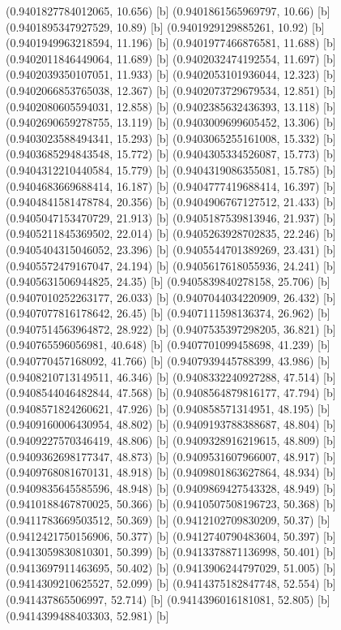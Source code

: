 {{{(0.9401827784012065, 10.656) [b] 
(0.9401861565969797, 10.66) [b] 
(0.9401895347927529, 10.89) [b] 
(0.9401929129885261, 10.92) [b] 
(0.9401949963218594, 11.196) [b] 
(0.9401977466876581, 11.688) [b] 
(0.9402011846449064, 11.689) [b] 
(0.9402032474192554, 11.697) [b] 
(0.9402039350107051, 11.933) [b] 
(0.9402053101936044, 12.323) [b] 
(0.9402066853765038, 12.367) [b] 
(0.9402073729679534, 12.851) [b] 
(0.9402080605594031, 12.858) [b] 
(0.9402385632436393, 13.118) [b] 
(0.9402690659278755, 13.119) [b] 
(0.9403009699605452, 13.306) [b] 
(0.9403023588494341, 15.293) [b] 
(0.9403065255161008, 15.332) [b] 
(0.9403685294843548, 15.772) [b] 
(0.9404305334526087, 15.773) [b] 
(0.9404312210440584, 15.779) [b] 
(0.9404319086355081, 15.785) [b] 
(0.9404683669688414, 16.187) [b] 
(0.9404777419688414, 16.397) [b] 
(0.9404841581478784, 20.356) [b] 
(0.9404906767127512, 21.433) [b] 
(0.9405047153470729, 21.913) [b] 
(0.9405187539813946, 21.937) [b] 
(0.9405211845369502, 22.014) [b] 
(0.9405263928702835, 22.246) [b] 
(0.9405404315046052, 23.396) [b] 
(0.9405544701389269, 23.431) [b] 
(0.9405572479167047, 24.194) [b] 
(0.9405617618055936, 24.241) [b] 
(0.9405631506944825, 24.35) [b] 
(0.9405839840278158, 25.706) [b] 
(0.9407010252263177, 26.033) [b] 
(0.9407044034220909, 26.432) [b] 
(0.9407077816178642, 26.45) [b] 
(0.9407111598136374, 26.962) [b] 
(0.9407514563964872, 28.922) [b] 
(0.9407535397298205, 36.821) [b] 
(0.940765596056981, 40.648) [b] 
(0.9407701099458698, 41.239) [b] 
(0.940770457168092, 41.766) [b] 
(0.9407939445788399, 43.986) [b] 
(0.9408210713149511, 46.346) [b] 
(0.9408332240927288, 47.514) [b] 
(0.9408544046482844, 47.568) [b] 
(0.9408564879816177, 47.794) [b] 
(0.9408571824260621, 47.926) [b] 
(0.940858571314951, 48.195) [b] 
(0.9409160006430954, 48.802) [b] 
(0.9409193788388687, 48.804) [b] 
(0.9409227570346419, 48.806) [b] 
(0.9409328916219615, 48.809) [b] 
(0.9409362698177347, 48.873) [b] 
(0.9409531607966007, 48.917) [b] 
(0.9409768081670131, 48.918) [b] 
(0.9409801863627864, 48.934) [b] 
(0.9409835645585596, 48.948) [b] 
(0.9409869427543328, 48.949) [b] 
(0.9410188467870025, 50.366) [b] 
(0.9410507508196723, 50.368) [b] 
(0.9411783669503512, 50.369) [b] 
(0.9412102709830209, 50.37) [b] 
(0.9412421750156906, 50.377) [b] 
(0.9412740790483604, 50.397) [b] 
(0.9413059830810301, 50.399) [b] 
(0.9413378871136998, 50.401) [b] 
(0.9413697911463695, 50.402) [b] 
(0.9413906244797029, 51.005) [b] 
(0.9414309210625527, 52.099) [b] 
(0.9414375182847748, 52.554) [b] 
(0.941437865506997, 52.714) [b] 
(0.9414396016181081, 52.805) [b] 
(0.9414399488403303, 52.981) [b] 
}}}
